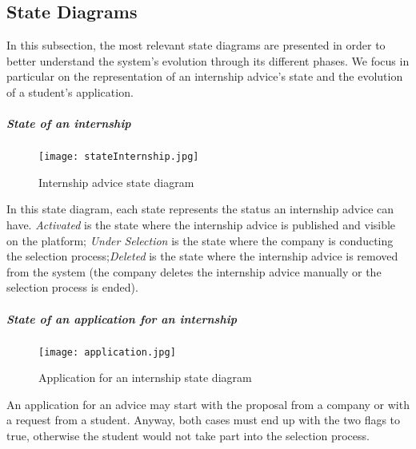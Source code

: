 			
			
			\subsection{State Diagrams}
				In this subsection, the most relevant state diagrams are presented in order to better understand the system's evolution through its different phases. We focus in particular on the representation of an internship advice's state and the evolution of a student's application.
				
				\subparagraph{State of an internship}
					\begin{figure}[H]
						\centering
						\texttt{[image: stateInternship.jpg]}
						\caption{Internship advice state diagram}
					\end{figure}
					
					In this state diagram, each state represents the status an internship advice can have. \textit{Activated} is the state where the internship advice is published and visible on the platform; \textit{Under Selection} is the state where the company is conducting the selection process;\textit{Deleted} is the state where the internship advice is removed from the system (the company deletes the internship advice manually or the selection process is ended).
					
				\subparagraph{State of an application for an internship}
					\begin{figure}[H]
						\centering
						\texttt{[image: application.jpg]}
						\caption{Application for an internship state diagram}
					\end{figure}
					
					An application for an advice may start with the proposal from a company or with a request from a student. Anyway, both cases must end up with the two flags to true, otherwise the student would not take part into the selection process.
					
